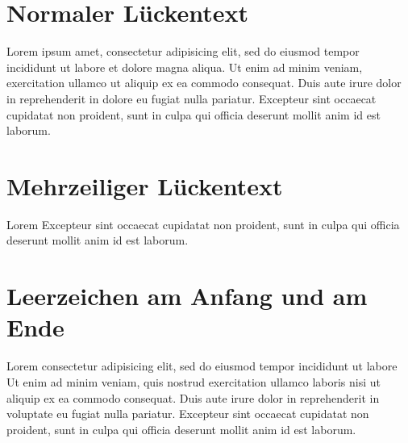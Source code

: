 \documentclass{article}
\begin{document}
\section{Normaler Lückentext}

Lorem ipsum  amet, consectetur adipisicing elit, sed do
eiusmod tempor incididunt ut labore et dolore magna aliqua. Ut enim ad
minim veniam,  exercitation ullamco  ut aliquip ex ea commodo consequat. Duis aute irure dolor in
reprehenderit in  dolore eu fugiat
nulla pariatur. Excepteur sint occaecat cupidatat non proident, sunt in
culpa qui officia deserunt mollit anim id est laborum.

\section{Mehrzeiliger Lückentext}

Lorem  Excepteur
sint occaecat cupidatat non proident, sunt in culpa qui officia deserunt
mollit anim id est laborum.

\section{Leerzeichen am Anfang und am Ende}

Lorem  consectetur adipisicing elit, sed
do eiusmod tempor incididunt ut labore 
Ut enim ad minim veniam, quis nostrud exercitation ullamco laboris nisi
ut aliquip ex ea commodo consequat. Duis aute irure dolor in
reprehenderit in voluptate  eu fugiat
nulla pariatur. Excepteur sint occaecat cupidatat non proident, sunt in
culpa qui officia deserunt mollit anim id est laborum.
\end{document}
